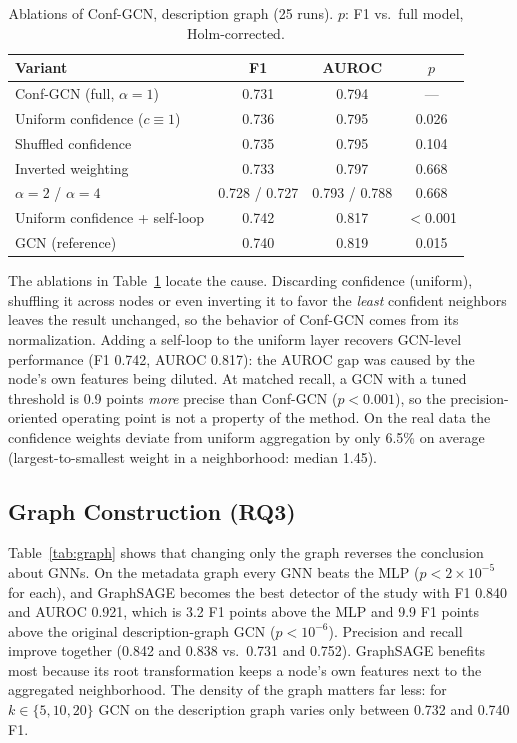 \documentclass[conference,a4paper]{IEEEtran}
\begin{document}
\begin{table}[htbp]
\caption{Ablations of Conf-GCN, description graph (25 runs). $p$: F1 vs.\ full model, Holm-corrected.}
\label{tab:abl}
\centering
\footnotesize
\setlength{\tabcolsep}{3pt}
\begin{tabular}{@{}lccc@{}}
\toprule
Variant & F1 & AUROC & $p$\\
\midrule
Conf-GCN (full, $\alpha=1$) & 0.731 & 0.794 & ---\\
Uniform confidence ($c\equiv1$) & 0.736 & 0.795 & 0.026\\
Shuffled confidence & 0.735 & 0.795 & 0.104\\
Inverted weighting & 0.733 & 0.797 & 0.668\\
$\alpha=2$ / $\alpha=4$ & 0.728 / 0.727 & 0.793 / 0.788 & 0.668\\
Uniform confidence + self-loop & 0.742 & 0.817 & $<$0.001\\
GCN (reference) & 0.740 & 0.819 & 0.015\\
\bottomrule
\end{tabular}
\end{table}

The ablations in Table~\ref{tab:abl} locate the cause. Discarding confidence (uniform), shuffling it across nodes or even inverting it to favor the \emph{least} confident neighbors leaves the result unchanged, so the behavior of Conf-GCN comes from its normalization. Adding a self-loop to the uniform layer recovers GCN-level performance (F1 0.742, AUROC 0.817): the AUROC gap was caused by the node's own features being diluted. At matched recall, a GCN with a tuned threshold is 0.9 points \emph{more} precise than Conf-GCN ($p<0.001$), so the precision-oriented operating point is not a property of the method. On the real data the confidence weights deviate from uniform aggregation by only 6.5\% on average (largest-to-smallest weight in a neighborhood: median 1.45).

\subsection{Graph Construction (RQ3)}
Table~\ref{tab:graph} shows that changing only the graph reverses the conclusion about GNNs. On the metadata graph every GNN beats the MLP ($p<2\times10^{-5}$ for each), and GraphSAGE becomes the best detector of the study with F1 0.840 and AUROC 0.921, which is 3.2 F1 points above the MLP and 9.9 F1 points above the original description-graph GCN ($p<10^{-6}$). Precision and recall improve together (0.842 and 0.838 vs.\ 0.731 and 0.752). GraphSAGE benefits most because its root transformation keeps a node's own features next to the aggregated neighborhood. The density of the graph matters far less: for $k\in\{5,10,20\}$ GCN on the description graph varies only between 0.732 and 0.740 F1.
\end{document}
